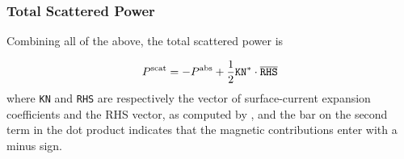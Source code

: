 \documentclass[letterpaper]{article}
\begin{document}
\subsubsection*{Total Scattered Power}

Combining all of the above, the total scattered power is 

$$P^{\hbox{\scriptsize{scat}}} = -P^{\hbox{\scriptsize{abs}}} + \frac{1}{2}\texttt{KN}^* \cdot \overline{\texttt{RHS}}$$
where \texttt{KN} and \texttt{RHS} are respectively the vector of 
surface-current expansion coefficients and the RHS vector, as computed
by \ls, and the bar on the second term in the dot product indicates that 
the magnetic contributions enter with a minus sign.
\end{document}
